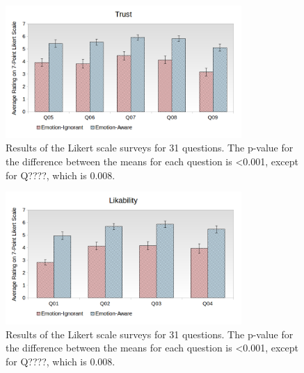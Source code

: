 \documentclass[12pt]{report}
\begin{document}
\begin{figure}
\centering
\includegraphics[width=0.8\textwidth]{figure/Overall-Trust.png}
\caption{Results of the Likert scale surveys for 31 questions. The p-value for
the difference between the means for each question is <0.001, except for Q????,
which is 0.008.}
\label{fig:overall-trust}
\end{figure}

\begin{figure}
\centering
\includegraphics[width=0.8\textwidth]{figure/Overall-Likability.png}
\caption{Results of the Likert scale surveys for 31 questions. The p-value for
the difference between the means for each question is <0.001, except for Q????,
which is 0.008.}
\label{fig:overall-likability}
\end{figure}
\end{document}
